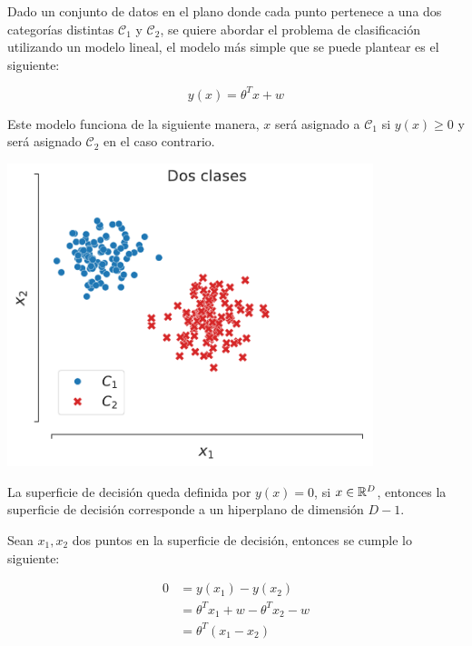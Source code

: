 \begin{minipage}{0.4\textwidth}
    Dado un conjunto de datos en el plano donde cada punto pertenece a una dos categorías distintas $\mathcal{C}_1$ y $\mathcal{C}_2$, se quiere abordar el problema de clasificación utilizando un modelo lineal, el modelo más simple que se puede plantear es el siguiente:
    
    \begin{equation}
        y(x) = \theta^Tx + w
    \end{equation}
    
    Este modelo funciona de la siguiente manera, $x$ será asignado a $\mathcal{C}_1$ si $y(x) \geq 0$ y será asignado $\mathcal{C}_2$ en el caso contrario.
\end{minipage}\hfill
\begin{minipage}{0.5\textwidth}
    \centering
    \includegraphics[width=0.8\textwidth]{img/cap2_dosclases}\\
    \label{fig:puntos_2d}
\end{minipage}

\vspace{1cm}
La superficie de decisión queda definida por $y(x)=0$, si $x\in{\mathbb R}^D$, entonces la superficie de decisión corresponde a un hiperplano de dimensión $D-1$.

Sean $x_1,x_2$ dos puntos en la superficie de decisión, entonces se cumple lo siguiente:

\begin{align}
    0 &= y(x_1) - y(x_2) \nonumber\\
      &= \theta^Tx_1 + w - \theta^Tx_2 - w \nonumber\\
      &= \theta^T(x_1-x_2)
\end{align}

